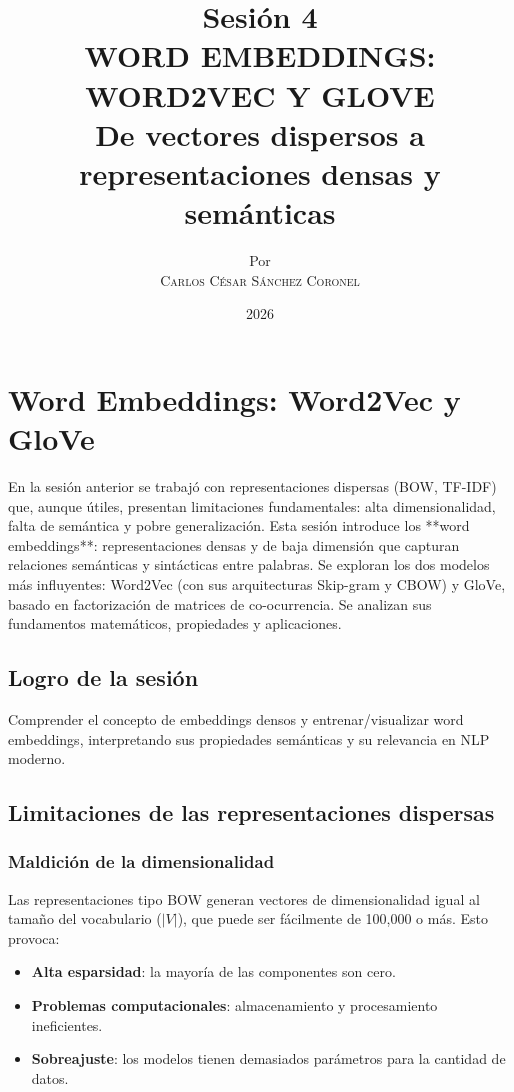 \documentclass[12pt,a4paper,openany,oneside]{book}
\title{
    \textbf{Sesión 4} \\ 
    \Huge \textbf{WORD EMBEDDINGS: WORD2VEC Y GLOVE} \\
    \Large De vectores dispersos a representaciones densas y semánticas
}
\author{
    \small Por \\ \vspace{0.2cm}
    \Large \textsc{Carlos César Sánchez Coronel}
}
\date{2026}
\begin{document}
\maketitle
\tableofcontents
{}

\chapter{Word Embeddings: Word2Vec y GloVe}

En la sesión anterior se trabajó con representaciones dispersas (BOW, TF-IDF) que, aunque útiles, presentan limitaciones fundamentales: alta dimensionalidad, falta de semántica y pobre generalización. Esta sesión introduce los **word embeddings**: representaciones densas y de baja dimensión que capturan relaciones semánticas y sintácticas entre palabras. Se exploran los dos modelos más influyentes: Word2Vec (con sus arquitecturas Skip-gram y CBOW) y GloVe, basado en factorización de matrices de co-ocurrencia. Se analizan sus fundamentos matemáticos, propiedades y aplicaciones.

\section{Logro de la sesión}
Comprender el concepto de embeddings densos y entrenar/visualizar word embeddings, interpretando sus propiedades semánticas y su relevancia en NLP moderno.

\section{Limitaciones de las representaciones dispersas}

\subsection{Maldición de la dimensionalidad}
Las representaciones tipo BOW generan vectores de dimensionalidad igual al tamaño del vocabulario (\(|V|\)), que puede ser fácilmente de 100,000 o más. Esto provoca:
\begin{itemize}
    \item \textbf{Alta esparsidad}: la mayoría de las componentes son cero.
    \item \textbf{Problemas computacionales}: almacenamiento y procesamiento ineficientes.
    \item \textbf{Sobreajuste}: los modelos tienen demasiados parámetros para la cantidad de datos.
\end{itemize}
\end{document}
